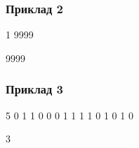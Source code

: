 \documentclass[12pt,a4paper]{article}
\begin{document}
\subsubsection*{Приклад 2}

\textbf{}

\begin{codeblock}
1
9999
\end{codeblock}

\textbf{}

\begin{codeblock}
9999
\end{codeblock}


\subsubsection*{Приклад 3}

\textbf{}

\begin{codeblock}
5
0
1 1
0 0 0
1 1 1 1
0 1 0 1 0
\end{codeblock}

\textbf{}

\begin{codeblock}
3
\end{codeblock}
\end{document}
